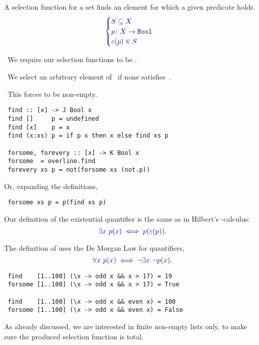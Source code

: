 \documentclass%
[%
Screen4to3,
]{foils}
\begin{document}
\vfill



A selection function for a set finds an element for which a
given predicate holds. 
\[
\darkblue{\begin{cases}
  S \subseteq X & \\
  p \colon X \to \mathtt{Bool} & \\
  \varepsilon(p) \in S
\end{cases}}
\]

\vfill

~We require our selection functions to be .


~We select an arbitrary element of~ if none
satisfies~.

~This forces  to be non-empty. 

\begin{verbatim}
 find :: [x] -> J Bool x
 find []     p = undefined
 find [x]    p = x
 find (x:xs) p = if p x then x else find xs p

 forsome, forevery :: [x] -> K Bool x
 forsome  = overline.find
 forevery xs p = not(forsome xs (not.p))
\end{verbatim}
Or, expanding the definitions,
\begin{verbatim}
 forsome xs p = p(find xs p)
\end{verbatim}


Our definition of the existential quantifier is the same as in
Hilbert's \darkblue{$\varepsilon$}-calculus:
\[
\darkblue{\exists x \,\, p(x) \iff p(\varepsilon(p))}.
\]


\vfill

The definition of  uses the De Morgan Law
for quantifiers,
\[
\darkblue{\forall x\,\, p(x) \iff \neg \exists x \,\, \neg p(x)}.
\]



\begin{verbatim}
 find    [1..100] (\x -> odd x && x > 17) = 19
 forsome [1..100] (\x -> odd x && x > 17) = True

 find    [1..100] (\x -> odd x && even x) = 100
 forsome [1..100] (\x -> odd x && even x) = False
\end{verbatim}


\vfill

As already discussed, we are interested in finite non-empty lists only,
to make sure the produced selection function is total. 
\end{document}
